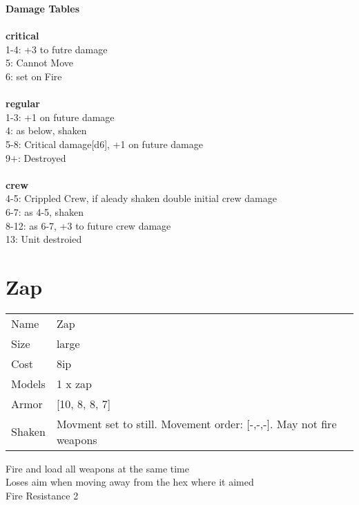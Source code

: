 {\bf Damage Tables} \\
\ \\ {\bf critical } \\
1-4: +3 to futre damage \\
5: Cannot Move \\
6: set on Fire \\
\ \\ {\bf regular } \\
1-3: +1 on future damage \\
4: as below, shaken \\
5-8: Critical damage[d6], +1 on future damage \\
9+: Destroyed \\
\ \\ {\bf crew } \\
4-5: Crippled Crew, if aleady shaken double initial crew damage \\
6-7: as 4-5, shaken \\
8-12: as 6-7, +3 to future crew damage \\
13: Unit destroied \\










\pagebreak\pagebreak

\section{ Zap }

\begin{tabular}{ll}
  Name & Zap \\
  Size & large\\
  Cost & 8ip\\
  Models & 1 x zap\\
  Armor & [10, 8, 8, 7]\\
  Shaken & Movment set to still. Movement order: [-,-,-]. May not fire weapons\\
\end{tabular}

\noindent Fire and load all weapons at the same time\\ 
Loses aim when moving away from the hex where it aimed\\ 
Fire Resistance 2\\ 


